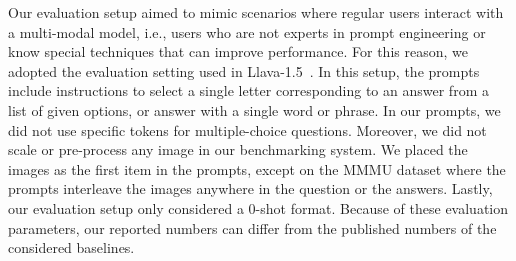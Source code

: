 \documentclass[11pt]{article}
\begin{document}
Our evaluation setup aimed to mimic scenarios where regular users interact with a multi-modal model, i.e., users who are not experts in prompt engineering or know special techniques that can improve performance. For this reason, we adopted the evaluation setting used in Llava-1.5~\cite{liu2023improved}. In this setup, the prompts include instructions to select a single letter corresponding to an answer from a list of given options, or answer with a single word or phrase. In our prompts, we did not use specific tokens for multiple-choice questions. Moreover, we did not scale or pre-process any image in our benchmarking system. We placed the images as the first item in the prompts, except on the MMMU dataset where the prompts interleave the images anywhere in the question or the answers. Lastly, our evaluation setup only considered a 0-shot format. Because of these evaluation parameters, our reported numbers can differ from the published numbers of the considered baselines. 
\end{document}
